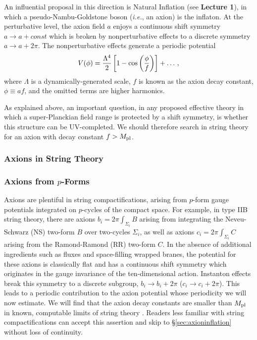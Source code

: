 \documentclass[12pt,letterpaper,rotate]{article}
\begin{document}
{An influential proposal in this direction is Natural Inflation \cite{Freese:1990rb} (see {\bf Lecture 1}),
in which a pseudo-Nambu-Goldstone boson ({\it i.e.}, an axion) is the inflaton. At the perturbative level, the axion field $a$ enjoys a continuous shift symmetry $a\to a+const $ which is broken by nonperturbative effects to a discrete symmetry $a\to a+2\pi$.
The nonperturbative effects generate a periodic potential
\begin{equation}
V(\phi)=\frac{\Lambda^4}{2} \left[ 1- \cos \left({\phi \over f}\right) \right]+ \ldots\, ,
\end{equation}
where $\Lambda$ is a dynamically-generated scale, $f$ is known as the axion decay constant, $\phi \equiv  a f$, and the omitted terms are higher harmonics.

As explained above, an important question, in any proposed effective theory in which a super-Planckian field range is protected by a shift symmetry, is whether this structure can be UV-completed.  We should therefore search in string theory for an axion with decay constant $f>M_{\rm pl}$.


\subsubsection{Axions in String Theory}

\subsubsection*{Axions from $p$-Forms}

Axions are plentiful in string compactifications, arising from $p$-form gauge potentials integrated on $p$-cycles of the compact space. For example, in type IIB string theory, there are axions $b_i =2\pi \int_{\Sigma_i} B$ arising from integrating the Neveu-Schwarz (NS) two-form $B$ over two-cycles $\Sigma_i$, as well as axions $c_i =2\pi
\int_{\Sigma_i} C$ arising from the Ramond-Ramond (RR) two-form $C$.
In the absence of additional ingredients such as fluxes and space-filling wrapped branes, the potential for these axions is classically flat and has a continuous shift symmetry which originates in the gauge invariance of the ten-dimensional action. Instanton effects break this symmetry to a discrete subgroup, $b_i \to b_i + 2\pi$ ($c_i \to c_i + 2\pi$).
This leads to a periodic contribution to the axion potential whose periodicity we will now estimate.
We will find that the axion decay constants are smaller than $M_{\rm pl}$ in known, computable limits of string theory \cite{Banks:2003sx,Svrcek:2006yi}.  Readers less familiar with string compactifications can accept this assertion and skip to \S\ref{sec:axioninflation} without loss of continuity.

}
\end{document}
